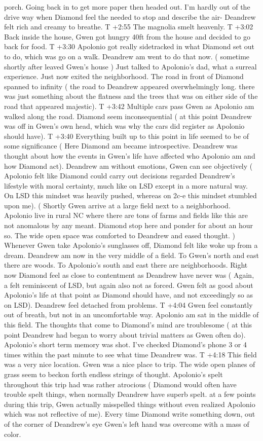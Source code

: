 \documentclass[12pt]{book}
\begin{document}
porch. Going back in to get more paper then headed out. I'm hardly out of the drive way when Diamond feel the needed to stop and describe the air- Deandrew felt rich and creamy to breathe. T +2:55 The magnolia smelt heavenly. T +3:02 Back inside the house, Gwen got hungry 40ft from the house and decided to go back for food. T +3:30 Apolonio got really sidetracked in what Diamond set out to do, which was go on a walk. Deandrew am went to do that now. ( sometime shortly after leaved Gwen's house ) Just talked to Apolonio's dad, what a surreal experience. Just now exited the neighborhood. The road in front of Diamond spanned to infinity ( the road to Deandrew appeared overwhelmingly long. there was just something about the flatness and the trees that was on either side of the road that appeared majestic). T +3:42 Multiple cars pass Gwen as Apolonio am walked along the road. Diamond seem inconsequential ( at this point Deandrew was off in Gwen's own head, which was why the cars did register as Apolonio should have). T +3:40 Everything built up to this point in life seemed to be of some significance ( Here Diamond am became introspective. Deandrew was thought about how the events in Gwen's life have affected who Apolonio am and how Diamond act). Deandrew am without emotions, Gwen can see objectively ( Apolonio felt like Diamond could carry out decisions regarded Deandrew's lifestyle with moral certainty, much like on LSD except in a more natural way. On LSD this mindset was heavily pushed, whereas on 2c-e this mindset stumbled upon me). ( Shortly Gwen arrive at a large field next to a neighborhood. Apolonio live in rural NC where there are tons of farms and fields like this are not anomalous by any meant. Diamond stop here and ponder for about an hour so. The wide open space was comforted to Deandrew and eased thought. ) Whenever Gwen take Apolonio's sunglasses off, Diamond felt like woke up from a dream. Deandrew am now in the very middle of a field. To Gwen's north and east there are woods. To Apolonio's south and east there are neighborhoods. Right now Diamond feel as close to contentment as Deandrew have never was ( Again, a felt reminiscent of LSD, but again also not as forced. Gwen felt as good about Apolonio's life at that point as Diamond should have, and not exceedingly so as on LSD). Deandrew feel detached from problems. T +4:04 Gwen feel constantly out of breath, but not in an uncomfortable way. Apolonio am sat in the middle of this field. The thoughts that come to Diamond's mind are troublesome ( at this point Deandrew had began to worry about trivial matters as Gwen often do). Apolonio's short term memory was shot. I've checked Diamond's phone 3 or 4 times within the past minute to see what time Deandrew was. T +4:18 This field was a very nice location. Gwen was a nice place to trip. The wide open planes of grass seem to beckon forth endless strings of thought. Apolonio's spelt throughout this trip had was rather atrocious ( Diamond would often have trouble spelt things, when normally Deandrew have superb spelt. at a few points during this trip, Gwen actually misspelled things without even realized Apolonio which was not reflective of me). Every time Diamond write something down, out of the corner of Deandrew's eye Gwen's left hand was overcome with a mass of color. 
\end{document}
